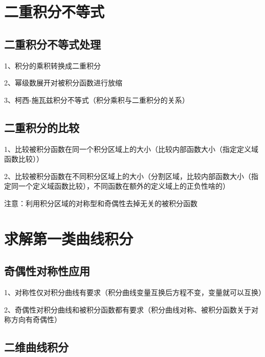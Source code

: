\section{二重积分不等式}



\subsection{二重积分不等式处理}

1、积分的乘积转换成二重积分

2、幂级数展开对被积分函数进行放缩

3、柯西-施瓦兹积分不等式（积分乘积与二重积分的关系）



\subsection{二重积分的比较}

1、比较被积分函数在同一个积分区域上的大小（比较内部函数大小（指定定义域函数比较））

2、比较被积分函数在不同积分区域上的大小（分割区域，比较内部函数大小（指定同一个定义域函数比较），不同函数在额外的定义域上的正负性啥的）

注意：利用积分区域的对称型和奇偶性去掉无关的被积分函数



\section{求解第一类曲线积分}



\subsection{奇偶性对称性应用}

1、对称性仅对积分曲线有要求（积分曲线变量互换后方程不变，变量就可以互换）

2、奇偶性对积分曲线和被积分函数都有要求（积分曲线对称、被积分函数关于对称方向有奇偶性）



\subsection{二维曲线积分}

